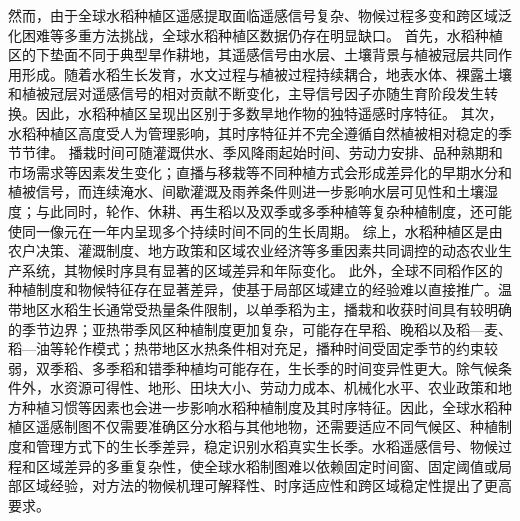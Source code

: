 然而，由于全球水稻种植区遥感提取面临遥感信号复杂、物候过程多变和跨区域泛化困难等多重方法挑战，全球水稻种植区数据仍存在明显缺口。
首先，水稻种植区的下垫面不同于典型旱作耕地，其遥感信号由水层、土壤背景与植被冠层共同作用形成。随着水稻生长发育，水文过程与植被过程持续耦合，地表水体、裸露土壤和植被冠层对遥感信号的相对贡献不断变化，主导信号因子亦随生育阶段发生转换。因此，水稻种植区呈现出区别于多数旱地作物的独特遥感时序特征。
其次，水稻种植区高度受人为管理影响，其时序特征并不完全遵循自然植被相对稳定的季节节律。
播栽时间可随灌溉供水、季风降雨起始时间、劳动力安排、品种熟期和市场需求等因素发生变化；直播与移栽等不同种植方式会形成差异化的早期水分和植被信号，而连续淹水、间歇灌溉及雨养条件则进一步影响水层可见性和土壤湿度；与此同时，轮作、休耕、再生稻以及双季或多季种植等复杂种植制度，还可能使同一像元在一年内呈现多个持续时间不同的生长周期。
综上，水稻种植区是由农户决策、灌溉制度、地方政策和区域农业经济等多重因素共同调控的动态农业生产系统，其物候时序具有显著的区域差异和年际变化。
此外，全球不同稻作区的种植制度和物候特征存在显著差异，使基于局部区域建立的经验难以直接推广。温带地区水稻生长通常受热量条件限制，以单季稻为主，播栽和收获时间具有较明确的季节边界；亚热带季风区种植制度更加复杂，可能存在早稻、晚稻以及稻—麦、稻—油等轮作模式；热带地区水热条件相对充足，播种时间受固定季节的约束较弱，双季稻、多季稻和错季种植均可能存在，生长季的时间变异性更大。除气候条件外，水资源可得性、地形、田块大小、劳动力成本、机械化水平、农业政策和地方种植习惯等因素也会进一步影响水稻种植制度及其时序特征。因此，全球水稻种植区遥感制图不仅需要准确区分水稻与其他地物，还需要适应不同气候区、种植制度和管理方式下的生长季差异，稳定识别水稻真实生长季。水稻遥感信号、物候过程和区域差异的多重复杂性，使全球水稻制图难以依赖固定时间窗、固定阈值或局部区域经验，对方法的物候机理可解释性、时序适应性和跨区域稳定性提出了更高要求。


